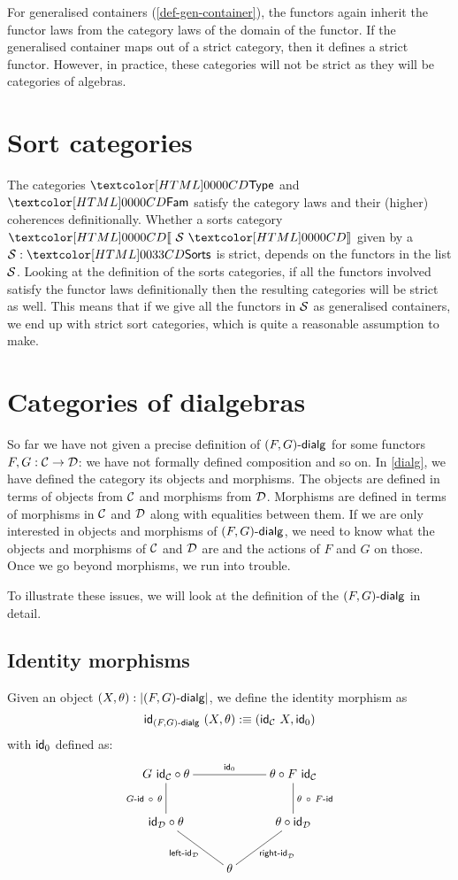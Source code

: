 For generalised containers (\cref{def-gen-container}), the functors
again inherit the functor laws from the category laws of the domain of
the functor. If the generalised container maps out of a strict
category, then it defines a strict functor. However, in practice,
these categories will not be strict as they will be categories of
algebras.

\section{Sort categories}
\label{coherence-sort-categories}

The categories $\Type$ and $\Fam$ satisfy the category laws and their
(higher) coherences definitionally. Whether a sorts category
$\SortCat{\Ss}$ given by a $\Ss : \sortsty$ is strict, depends on the
functors in the list $\mathcal{S}$. Looking at the definition of the sorts
categories, if all the functors involved satisfy the functor laws
definitionally then the resulting categories will be strict as
well. This means that if we give all the functors in $\mathcal{S}$ as
generalised containers, we end up with strict sort categories, which
is quite a reasonable assumption to make.

\section{Categories of dialgebras}

So far we have not given a precise definition of $\dialgcat{F}{G}$ for
some functors $F, G : \mathcal{C} \to \mathcal{D}$: we have not formally defined
composition and so on. In \cref{dialg}, we have defined the category
its objects and morphisms. The objects are defined in terms of objects
from $\mathcal{C}$ and morphisms from $\mathcal{D}$. Morphisms are defined in terms of
morphisms in $\mathcal{C}$ and $\mathcal{D}$ along with equalities between them. If we
are only interested in objects and morphisms of $\dialgcat{F}{G}$, we
need to know what the objects and morphisms of $\mathcal{C}$ and $\mathcal{D}$ are and
the actions of $F$ and $G$ on those. Once we go beyond morphisms, we
run into trouble.

To illustrate these issues, we will look at the definition of the
$\dialgcat{F}{G}$ in detail. 

\subsection{Identity morphisms}

Given an object $(X,\theta) : | \dialgcat{F}{G} |$, we define the
identity morphism as
$$
\id_{\dialgcat{F}{G}}\ (X,\theta) \ddefeq (\id_\Cc\ X , \id_0)
$$
with $\id_0$ defined as:
$$
\xymatrix{
G\ \id_\Cc \circ \theta
\ar@{-}[rr]^{\id_0}
\ar@{-}[d]_{\Gid\ \circ\ \theta}
&
&\theta \circ F\ \id_\Cc
\ar@{-}[d]^{\theta\ \circ\ \Fid}
\\
\id_\Dd \circ \theta
\ar@{-}[dr]_{\leftid_{\Dd}}
&
&\theta \circ \id_\Dd
\ar@{-}[dl]^{\rightid_{\Dd}}
\\
&\theta
&
}
$$

